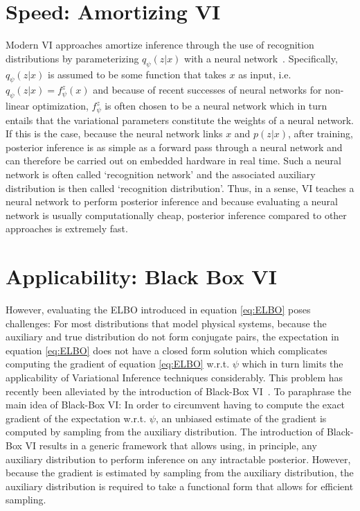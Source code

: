 \documentclass[11pt]{cmuthesis} %
\begin{document}
\section{Speed: Amortizing VI}
Modern VI approaches amortize inference through the use of recognition distributions by parameterizing $q_\psi(z|x)$ with a neural network~\cite{kingma2013auto,mnih2014neural}. Specifically, $q_\psi(z|x)$ is assumed to be some function that takes $x$ as input, i.e. $q_\psi(z|x) = f^z_\psi(x)$ and because of recent successes of neural networks for non-linear optimization, $f^z_\psi$ is often chosen to be a neural network which in turn entails that the variational parameters constitute the weights of a neural network. If this is the case, because the neural network links $x$ and $p(z|x)$, after training, posterior inference is as simple as a forward pass through a neural network and can therefore be carried out on embedded hardware in real time. Such a neural network is often called `recognition network' and the associated auxiliary distribution is then called `recognition distribution'. Thus, in a sense, VI teaches a neural network to perform posterior inference and because evaluating a neural network is usually computationally cheap, posterior inference compared to other approaches is extremely fast.

\section{Applicability: Black Box VI}
However, evaluating the ELBO introduced in equation \ref{eq:ELBO} poses challenges: For most distributions that model physical systems, because the auxiliary and true distribution do not form conjugate pairs, the expectation in equation \ref{eq:ELBO} does not have a closed form solution which complicates computing the gradient of equation \ref{eq:ELBO} w.r.t. $\psi$ which in turn limits the applicability of Variational Inference techniques considerably. This problem has recently been alleviated by the introduction of Black-Box VI~\cite{ranganath2014black}. To paraphrase the main idea of Black-Box VI: In order to circumvent having to compute the exact gradient of the expectation w.r.t. $\psi$, an unbiased estimate of the gradient is computed by sampling from the auxiliary distribution. The introduction of Black-Box VI results in a generic framework that allows using, in principle, any auxiliary distribution to perform inference on any intractable posterior. However, because the gradient is estimated by sampling from the auxiliary distribution, the auxiliary distribution is required to take a functional form that allows for efficient sampling.
\end{document}
